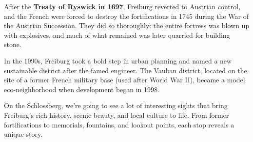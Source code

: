 \documentclass[landscape, a4paper]{article}
\newcommand\alert[1]{\textcolor{PrimaryColor}{\textbf{#1}}}
\begin{document}
\begin{minipage}[t]{0.31\textwidth}
{		After the \alert{Treaty of Ryswick in 1697}, Freiburg reverted to Austrian control, and the French were forced to destroy the fortifications in 1745 during the War of the Austrian Succession. They did so thoroughly: the entire fortress was blown up with explosives, and much of what remained was later quarried for building stone.

		In the 1990s, Freiburg took a bold step in urban planning and named a new sustainable district after the famed engineer. The Vauban district, located on the site of a former French military base (used after World War II), became a model eco-neighborhood when development began in 1998.

		On the Schlossberg, we're going to see a lot of interesting sights that bring Freiburg’s rich history, scenic beauty, and local culture to life. From former fortifications to memorials, fountains, and lookout points, each stop reveals a unique story.
	}{
	}
\end{minipage}%
\hfill\color{white}%
\vrule width 0.01cm
\hfill\color{black}%
\end{document}
